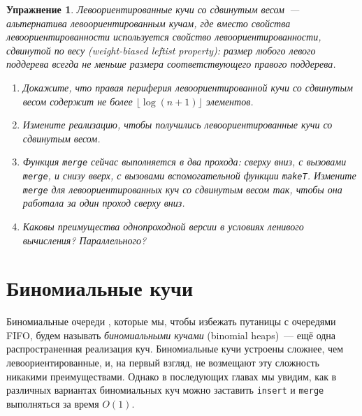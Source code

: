 \documentclass[aspectratio=169
  , xcolor={svgnames}
  , hyperref={ colorlinks,citecolor=DeepPink4
             , linkcolor=DarkRed,urlcolor=DarkBlue}
  , russian
  ]{beamer}
\newcommand{\term}[2]{\textit{#1} (#2)}
\theoremstyle{exerciseStyle1}
\newtheorem{exercise}{\textbf{Упражнение}}[section]
\renewcommand{\cite}[1]{}
\begin{document}
\begin{frame}[fragile]{}
\begin{exercise}\label{ex:3.4}
  Левоориентированные кучи
  со сдвинутым весом~--- альтернатива левоориентированным кучам, где
  вместо свойства левоориентированности используется свойство
  \term{левоориентированности, сдвинутой по весу}{weight-biased leftist
    property}: размер любого левого поддерева всегда не меньше размера
  соответствующего правого поддерева.
  \begin{enumerate}
    \item Докажите, что правая периферия левоориентированной кучи со
    сдвинутым весом содержит не более $\lfloor \log(n+1) \rfloor$ элементов.
    \item Измените реализацию, чтобы получились
    левоориентированные кучи со сдвинутым весом.
    \item Функция \lstinline!merge! сейчас выполняется в два прохода:
    сверху вниз, с вызовами \lstinline!merge!, и снизу вверх, с
    вызовами вспомогательной функции \lstinline!makeT!. Измените
    \lstinline!merge! для левоориентированных куч со сдвинутым весом
    так, чтобы она работала за один проход сверху вниз.
    \item Каковы преимущества однопроходной версии в
    условиях ленивого вычисления? Параллельного?
  \end{enumerate}
\end{exercise}

\end{frame}

\section{Биномиальные кучи}
\label{sc:3.2}

\begin{frame}[fragile]{}
Биномиальные очереди \cite{Vuillemin1978, Brown1978}, которые мы,
чтобы избежать путаницы с очередями FIFO, будем называть \term{ биномиальными
  кучами}{binomial heaps}~--- ещё одна распространенная реализация
куч. Биномиальные кучи устроены сложнее, чем левоориентированные, и, на
первый взгляд, не возмещают эту сложность никакими
преимуществами. Однако в последующих главах мы увидим, как в различных
вариантах биномиальных куч можно заставить \lstinline!insert! и
\lstinline!merge! выполняться за время $O(1)$.

\end{frame}
\end{document}
